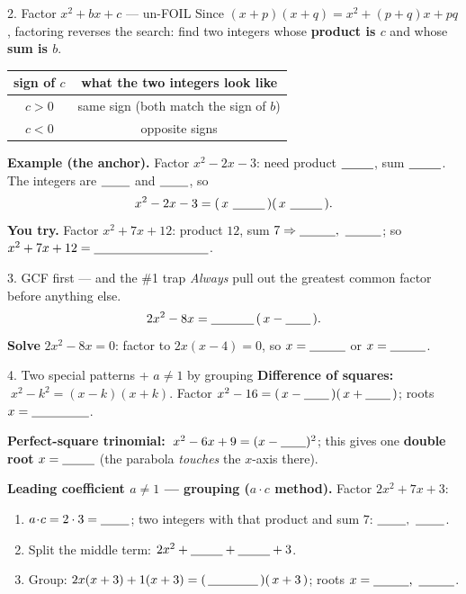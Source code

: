 \documentclass[10pt]{article}
\begin{document}
\begin{notesbox}{2. Factor $x^2+bx+c$ --- un-FOIL}
Since $(x+p)(x+q)=x^2+(p+q)x+pq$, factoring reverses the search: find two integers whose
\textbf{product is $c$} and whose \textbf{sum is $b$}.
\begin{center}
\renewcommand{\arraystretch}{1.4}
\begin{tabular}{|c|c|}
\hline
\textbf{sign of $c$} & \textbf{what the two integers look like} \\ \hline
$c>0$ & same sign (both match the sign of $b$) \\ \hline
$c<0$ & opposite signs \\ \hline
\end{tabular}
\end{center}
\textbf{Example (the anchor).} Factor $x^2-2x-3$: need product $\blank{0.9cm}$, sum $\blank{0.9cm}$.
The integers are $\blank{0.8cm}$ and $\blank{0.8cm}$, so
\[ x^2-2x-3 = (\,x\ \blank{0.9cm}\,)(\,x\ \blank{0.9cm}\,). \]
\textbf{You try.} Factor $x^2+7x+12$: product $12$, sum $7 \Rightarrow \blank{1.0cm},\ \blank{1.0cm}$;
so $x^2+7x+12 = \blank{3.2cm}$.
\end{notesbox}

\begin{notesbox}{3. GCF first --- and the \#1 trap}
\emph{Always} pull out the greatest common factor before anything else.
\[ 2x^2-8x = \blank{1.2cm}\,(\,x-\blank{0.7cm}\,). \]
\textbf{Solve} $2x^2-8x=0$: factor to $2x(x-4)=0$, so $x=\blank{1.0cm}$ or $x=\blank{1.0cm}$.

\vspace{3pt}
\end{notesbox}

\begin{notesbox}{4. Two special patterns + $a\ne1$ by grouping}
\textbf{Difference of squares:} $\;x^2-k^2=(x-k)(x+k)$. \quad
Factor $x^2-16 = (\,x-\blank{0.7cm}\,)(\,x+\blank{0.7cm}\,)$; roots $x=\blank{1.6cm}$.

\vspace{2pt}
\textbf{Perfect-square trinomial:} $\;x^2-6x+9=(x-\blank{0.7cm})^2$; this gives one \textbf{double root}
$x=\blank{0.9cm}$ (the parabola \emph{touches} the $x$-axis there).

\vspace{2pt}
\textbf{Leading coefficient $a\ne1$ --- grouping ($a\!\cdot\!c$ method).} Factor $2x^2+7x+3$:
\begin{enumerate}[leftmargin=1.7em, itemsep=1pt]
  \item $a\!\cdot\!c = 2\cdot3 = \blank{0.8cm}$; two integers with that product and sum $7$: $\blank{0.8cm},\ \blank{0.8cm}$.
  \item Split the middle term: $2x^2+\blank{0.9cm}+\blank{0.9cm}+3$.
  \item Group: $2x(x+3)+1(x+3) = (\,\blank{1.4cm}\,)(\,x+3\,)$; roots $x=\blank{1.0cm},\ \blank{1.0cm}$.
\end{enumerate}
\end{notesbox}
\end{document}
